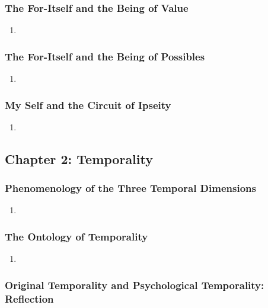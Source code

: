 \subsubsection{The For-Itself and the Being of Value}

\begin{enumerate}
  \item
\end{enumerate}

\subsubsection{The For-Itself and the Being of Possibles}

\begin{enumerate}
  \item
\end{enumerate}

\subsubsection{My Self and the Circuit of Ipseity}

\begin{enumerate}
  \item
\end{enumerate}

\subsection{Chapter 2: Temporality}

\subsubsection{Phenomenology of the Three Temporal Dimensions}

\begin{enumerate}
  \item
\end{enumerate}

\subsubsection{The Ontology of Temporality}

\begin{enumerate}
  \item
\end{enumerate}

\subsubsection{Original Temporality and Psychological Temporality: Reflection}

